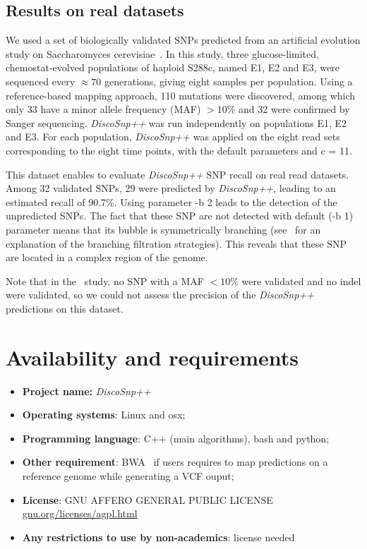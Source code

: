 \documentclass{bmcart}
\newcommand{\discopp}{{\it DiscoSnp++}\xspace}
\begin{document}
\subsection*{Results on real datasets}
We used a set of biologically validated SNPs predicted from an artificial evolution study on Saccharomyces cerevisiae~\cite{Kvitek2013}. 
In this study, three glucose-limited, chemostat-evolved populations of haploid S288c, named
E1, E2 and E3, were sequenced every $\approx70$ generations, giving eight samples per population. Using a reference-based mapping approach, 110 mutations were discovered, among which only 33 have a minor allele frequency (MAF) $>10\%$ and 32 were confirmed by Sanger sequencing.  \discopp was run independently on populations E1, E2 and E3. For each population, \discopp was applied on the eight read sets corresponding to the eight time points, with the default parameters and c = 11. 

This dataset enables to evaluate \discopp SNP recall on real read datasets. Among 32 validated SNPs, 29 were predicted by \discopp, leading to an estimated recall of 90.7\%. Using parameter -b 2 leads to the detection of the unpredicted SNPs. The fact that these SNP are not detected with default (-b 1) parameter means that its bubble is symmetrically branching (see~\cite{Uricaru2014a} for an explanation of the branching filtration strategies). This reveals that these SNP are located in a complex region of the genome. 

Note that in the~\cite{Kvitek2013} study, no SNP with a MAF $<10\%$ were validated and no indel were validated, so we could not assess the precision of the \discopp predictions on this dataset.


\section*{Availability and requirements}
\begin{itemize}
	\item \textbf{Project name:} \discopp
	\item \textbf{Operating systems}: Linux and osx;
	\item \textbf{Programming language}: C++ (main algorithms), bash and python;
	\item \textbf{Other requirement}: BWA~\cite{bwa} if users requires to map predictions on a reference genome while generating a VCF ouput;
	\item \textbf{License}: GNU AFFERO GENERAL PUBLIC LICENSE \url{gnu.org/licenses/agpl.html}
	\item \textbf{Any restrictions to use by non-academics}: license needed
\end{itemize}
\end{document}
